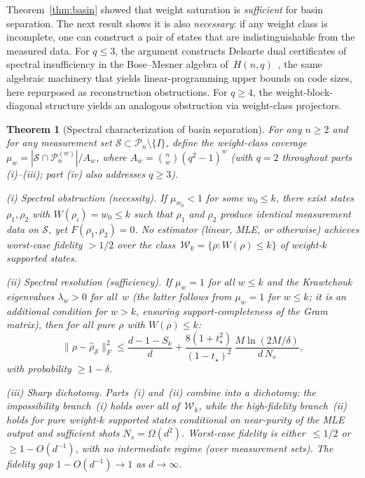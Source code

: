 \documentclass[twocolumn,prx,aps,superscriptaddress,longbibliography,floatfix]{revtex4-2}
\newtheorem{theorem}{Theorem}
\newcommand{\pclaim}[4]{}
\begin{document}
Theorem~\ref{thm:basin} showed that weight saturation is
\emph{sufficient} for basin separation.  The next result shows it
is also \emph{necessary}: if any weight class is incomplete,
one can construct a pair of states that are indistinguishable
from the measured data.  For $q \le 3$, the argument constructs Delsarte dual certificates
of spectral insufficiency in the Bose--Mesner algebra
of~$H(n,q)$~\cite{Delsarte1973,BannaiIto1984}, the same
algebraic machinery that yields linear-programming upper bounds
on code sizes, here repurposed as reconstruction obstructions.
For $q \ge 4$, the weight-block-diagonal structure yields an
analogous obstruction via weight-class projectors.

\pclaim{env:thm:spectral-char}{proved}{n>=2,q=2}{thm:spectral-char}%
\begin{theorem}[Spectral characterization of basin separation]
\label{thm:spectral-char}
For any $n \ge 2$ and for any measurement set
$\mathcal{S} \subset \mathcal{P}_n \setminus \{I\}$,
define the weight-class coverage
$\mu_w = |\mathcal{S} \cap \mathcal{P}_n^{(w)}| / A_w$,
where $A_w = \binom{n}{w}(q^2{-}1)^w$
(with $q = 2$ throughout parts (i)--(iii); part (iv) also
addresses $q \ge 3$).

\textup{(i)} \emph{Spectral obstruction (necessity).}
If $\mu_{w_0} < 1$ for some $w_0 \le k$, there exist states
$\rho_1, \rho_2$ with $W(\rho_i) = w_0 \le k$ such that
$\rho_1$ and $\rho_2$ produce identical measurement
data on $\mathcal{S}$, yet $F(\rho_1, \rho_2) = 0$.
No estimator (linear, MLE, or otherwise) achieves worst-case
fidelity $> 1/2$ over the class~$\mathcal{W}_k = \{\rho : W(\rho) \le k\}$ of weight-$k$ supported states.

\textup{(ii)} \emph{Spectral resolution (sufficiency).}
If $\mu_w = 1$ for all $w \le k$ and the Krawtchouk eigenvalues
$\lambda_w > 0$ for all~$w$
(the latter follows from $\mu_w = 1$ for $w \le k$;
it is an additional condition for $w > k$, ensuring
support-completeness of the Gram matrix),
then for all pure $\rho$ with
$W(\rho) \le k$:
\begin{equation}\label{eq:spectral-resolution}
  \|\rho - \hat\rho_{\mathcal{S}}\|_F^2 \le \frac{d{-}1{-}S_k}{d}
  + \frac{8(1{+}t_\star^2)}{(1{-}t_\star)^2}
    \,\frac{M\ln(2M/\delta)}{d\,N_s},
\end{equation}
with probability $\ge 1 - \delta$.

\textup{(iii)} \emph{Sharp dichotomy.}
Parts~(i) and~(ii) combine into a dichotomy:
the impossibility branch~(i) holds over all
of~$\mathcal{W}_k$, while the high-fidelity
branch~(ii) holds for pure weight-$k$ supported states
conditional on near-purity of the MLE output
and sufficient shots $N_s = \Omega(d^2)$.
Worst-case fidelity is either~$\le 1/2$
or~$\ge 1 - O(d^{-1})$, with no intermediate regime
(over measurement sets).
The fidelity gap $1 - O(d^{-1}) \to 1$ as $d\to\infty$.


\end{theorem}
\end{document}
